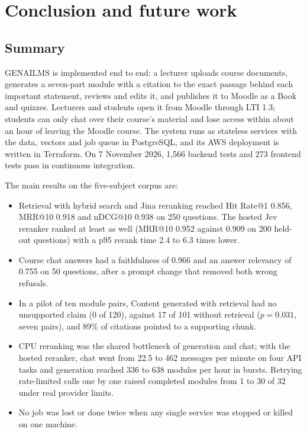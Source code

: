\clearpage\section{Conclusion and future work}\label{sec:conclusion}\label{sec:plan}\label{sec:progress}
\subsection{Summary}
GENAILMS is implemented end to end: a lecturer uploads course documents, generates a seven-part module with a citation to the exact passage behind each important statement, reviews and edits it, and publishes it to Moodle as a Book and quizzes. Lecturers and students open it from Moodle through LTI 1.3; students can only chat over their course's material and lose access within about an hour of leaving the Moodle course. The system runs as stateless services with the data, vectors and job queue in PostgreSQL, and its AWS deployment is written in Terraform. On 7 November 2026, 1,566 backend tests and 273 frontend tests pass in continuous integration.

The main results on the five-subject corpus are:
\begin{itemize}[leftmargin=*,nosep]
\item Retrieval with hybrid search and Jina reranking reached Hit Rate@1 0.856, MRR@10 0.918 and nDCG@10 0.938 on 250 questions. The hosted Jev reranker ranked at least as well (MRR@10 0.952 against 0.909 on 200 held-out questions) with a p95 rerank time 2.4 to 6.3 times lower.
\item Course chat answers had a faithfulness of 0.966 and an answer relevancy of 0.755 on 50 questions, after a prompt change that removed both wrong refusals.
\item In a pilot of ten module pairs, Content generated with retrieval had no unsupported claim (0 of 120), against 17 of 101 without retrieval ($p=0.031$, seven pairs), and 89\% of citations pointed to a supporting chunk.
\item CPU reranking was the shared bottleneck of generation and chat; with the hosted reranker, chat went from 22.5 to 462 messages per minute on four API tasks and generation reached 336 to 638 modules per hour in bursts. Retrying rate-limited calls one by one raised completed modules from 1 to 30 of 32 under real provider limits.
\item No job was lost or done twice when any single service was stopped or killed on one machine.
\end{itemize}
